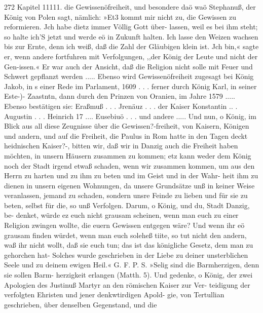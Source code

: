 272 Kapitel 11111.
die Gewissenöfreiheit, und besondere daö waö Stephanuß, der
König von Polen sagt, nämlich: »Et3 kommt mir nicht zu, die
Gewissen zu reformieren. Jch habe dietz immer Völlig Gott über-
lassen, weil es bei ihm steht; so halte ich'S jetzt und werde eö
in Zukunft halten. Ich lasse den Weizen wachsen bis zur Ernte,
denn ich weiß, daß die Zahl der Gläubigen klein ist. Jch bin,«
sagte er, wenn andere fortfuhren mit Verfolgungen, ,,der König
der Leute und nicht der Gen-issen.« Er war auch der Ansicht,
daß die Religion nicht solle mit Feuer und Schwert gepflanzt
werden .....
Ebenso wird Gewissenöfreiheit zugesagt bei König Jakob, in s einer
Rede im Parlament, 1609 . . . ferner durch König Karl, in seiner
Este-)- Zaastntn, dann durch den Prinzen von Oranien, im
Jahre 1579 ..... Ebenso bestätigen sie: Eraßmuß . . . Jrenäuz . . .
der Kaiser Konstantin .. . Augustin . . . Heinrich 17 .... Eusebiuö . . .
und andere ..... Und nun, o König, im Blick aus all diese
Zeugnisse über die Gewissen?-freiheit, von Kaisern, Königen und
andern, und auf die Freiheit, die Paulus in Rom hatte in den
Tagen deckt heidnischen Kaiser?-, bitten wir, daß wir in Danzig
auch die Freiheit haben möchten, in unsern Häusern zusammen
zu kommen; etz kann weder dem König noch der Stadt irgend
etwaß schaden, wenn wir zusammen kommen, um aus den Herrn
zu harten und zu ihm zu beten und im Geist und in der Wahr-
heit ihm zu dienen in unsern eigenen Wohnungen, da unsere
Grundsätze unß in keiner Weise veranlassen, jemand zu schaden,
sondern unsre Feinde zu lieben und für sie zu beten, selbst für die,
so unß Verfolgen. Darum, o König, und du, Stadt Danzig, be-
denket, würde ez euch nicht grausam scheinen, wenn man euch zu
einer Religion zwingen wollte, die euern Gewissen entgegen wäre?
Und wenn ihr eö grausam finden würdet, wenn man euch soleheß
tiite, so tut nicht den andern, waß ihr nicht wollt, daß sie euch
tun; das ist das königliche Gesetz, dem man zu gehorchen hat-
Solches wurde geschrieben in der Liebe zu deiner unsterblichen
Seele und zu deinem ewigen Heil.« G. F.
P. S. »Selig sind die Barmherzigen, denn sie sollen Barm-
herzigkeit erlangen (Matth. 5). Und gedenke, o König, der zwei
Apologien des Justinuß Martyr an den römischen Kaiser zur Ver-
teidigung der verfolgten Ehristen und jener denkwtirdigen Apold-
gie, von Tertullian geschrieben, über denselben Gegenstand, und die


